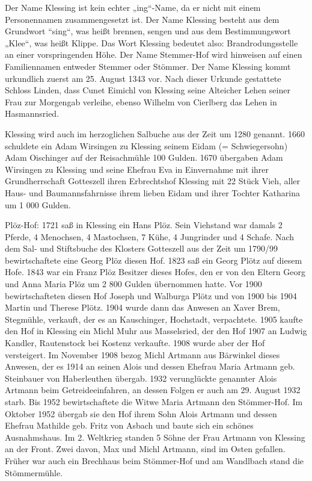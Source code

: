 \documentclass[12pt,a4pager]{book}
\begin{document}
Der Name Klessing ist kein echter „ing“-Name, da er nicht mit einem
Personennamen zusammengesetzt ist. Der Name Klessing besteht aus dem Grundwort
“sing“, was heißt brennen, sengen und aus dem Bestimmungswort „Klee“, was heißt
Klippe. Das Wort Klessing bedeutet also: Brandrodungsstelle an einer
vorspringenden Höhe. Der Name Stemmer-Hof wird hinweisen auf einen Familiennamen
entweder Stemmer oder Stömmer. Der Name Klessing kommt urkundlich zuerst am 25.
August 1343 vor. Nach dieser Urkunde gestattete Schloss Linden, dass Cunet
Eimichl von Klessing seine Alteicher Lehen seiner Frau zur Morgengab verleihe,
ebenso Wilhelm von Cierlberg das Lehen in Hasmannsried.

Klessing wird auch im herzoglichen Salbuche aus der Zeit um 1280 genannt. 1660
schuldete ein Adam Wirsingen zu Klessing seinem Eidam (= Schwiegersohn) Adam
Oischinger auf der Reisachmühle 100 Gulden. 1670 übergaben Adam Wirsingen zu
Klessing und seine Ehefrau Eva in Einvernahme mit ihrer Grundherrschaft
Gotteszell ihren Erbrechtshof Klessing mit 22 Stück Vieh, aller Haus- und
Baumannsfahrnisse ihrem lieben Eidam und ihrer Tochter Katharina um 1 000
Gulden.

Plöz-Hof: 1721 saß in Klessing ein Hans Plöz. Sein Viehstand war damals 2
Pferde, 4 Menochsen, 4 Mastochsen, 7 Kühe, 4 Jungrinder und 4 Schafe. Nach dem
Sal- und Stiftsbuche des Klosters Gotteszell aus der Zeit um 1790/99
bewirtschaftete eine Georg Plöz diesen Hof. 1823 saß ein Georg Plötz auf diesem
Hofe. 1843 war ein Franz Plöz Besitzer dieses Hofes, den er von den Eltern Georg
und Anna Maria Plöz um 2 800 Gulden übernommen hatte. Vor 1900 bewirtschafteten
diesen Hof Joseph und Walburga Plötz und von 1900 bis 1904 Martin und Therese
Plötz. 1904 wurde dann das Anwesen an Xaver Brem, Stegmühle, verkauft, der es an
Kauschinger, Hochstadt, verpachtete. 1905 kaufte den Hof in Klessing ein Michl
Muhr aus Masselsried, der den Hof 1907 an Ludwig Kandler, Rautenstock bei
Kostenz verkaufte. 1908 wurde aber der Hof versteigert. Im November 1908 bezog
Michl Artmann aus Bärwinkel dieses Anwesen, der es 1914 an seinen Alois und
dessen Ehefrau Maria Artmann geb. Steinbauer von Haberleuthen übergab. 1932
verunglückte genannter Alois Artmann beim Getreideeinfahren, an dessen Folgen er
auch am 29. August 1932 starb. Bis 1952 bewirtschaftete die Witwe Maria Artmann
den Stömmer-Hof. Im Oktober 1952 übergab sie den Hof ihrem Sohn Alois Artmann
und dessen Ehefrau Mathilde geb. Fritz von Asbach und baute sich ein schönes
Ausnahmshaus. Im 2. Weltkrieg standen 5 Söhne der Frau Artmann von Klessing an
der Front. Zwei davon, Max und Michl Artmann, sind im Osten gefallen. Früher war
auch ein Brechhaus beim Stömmer-Hof und am Wandlbach stand die Stömmermühle.
\end{document}

